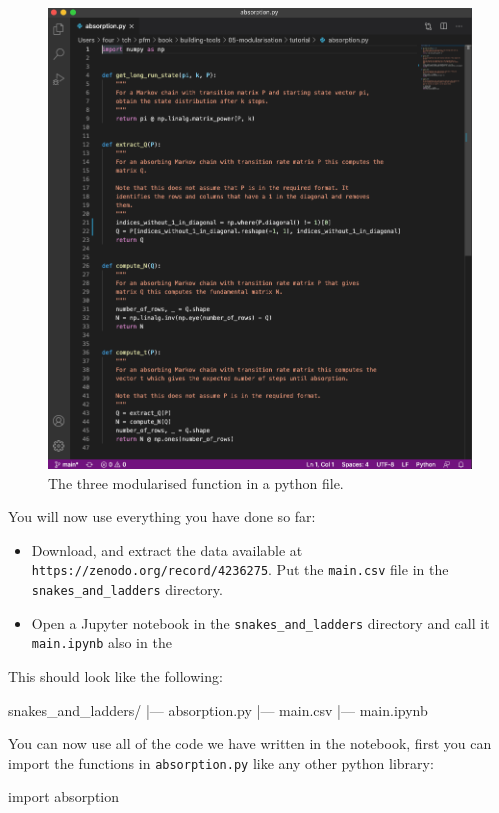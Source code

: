 \begin{figure}[htbp]
\centering
    \includegraphics[width=.7\textwidth]{assets/absorption/main.png}
    \caption{The three modularised function in a python file.}
    \label{fig:absorption.py}
\end{figure}


You will now use everything you have done so far:
\begin{itemize}
\item 

Download, and extract the data available at
\texttt{https://zenodo.org/record/4236275}. Put the
\texttt{main.csv} file in the \texttt{snakes\_and\_ladders}
directory.

\item 

Open a Jupyter notebook in the 
\texttt{snakes\_and\_ladders} directory
and call it \texttt{main.ipynb} also in the

\end{itemize}


This should look like the following:

\begin{raw}
snakes_and_ladders/
    |--- absorption.py
    |--- main.csv
    |--- main.ipynb
\end{raw}


You can now use all of the code we have written in the notebook, first you can
import the functions in \texttt{absorption.py} like any other python library:




\begin{pyin}
import absorption
\end{pyin}





